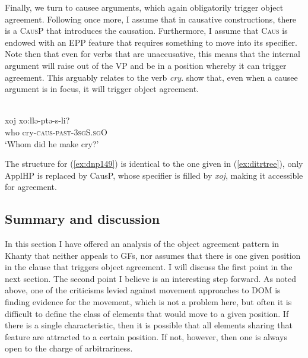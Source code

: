 \documentclass[output=paper
,modfonts
,nonflat]{langsci/langscibook}
\begin{document}
\noindent Finally, we turn to causee arguments, which again obligatorily trigger object agreement.
Following \citet{pylkkanen2008} once more, I assume that in causative constructions, there is a \textsc{CausP} that introduces the causation.
Furthermore, I assume that \textsc{Caus} is endowed with an EPP feature that requires something to move into its specifier. Note then that even for verbs that are unaccusative, this means that the internal argument will raise out of the VP and be in a position whereby it can trigger agreement. This arguably relates to the verb \emph{cry}. \citeauthor{dn2011} show that, even when a causee argument is in focus, it will trigger object agreement. 

\begin{exe}
\ex \citet[][149]{dn2011} \label{ex:dnp149}\\
{\gll xoj xo:llə-ptə-s-li?\\
who cry-\textsc{caus-past-3sgS.sgO}\\
\glt `Whom did he make cry?'}
\end{exe}

\noindent The structure for (\ref{ex:dnp149}) is identical to the one given in (\ref{ex:ditrtree}), only ApplHP is replaced by CausP, whose specifier is filled by \emph{xoj}, making it accessible for agreement.

\subsection{Summary and discussion}

In this section I have offered an analysis of the object agreement pattern in Khanty that neither appeals to GFs, nor assumes that there is one given position in the clause that triggers object agreement. 
I will discuss the first point in the next section.
The second point I believe is an interesting step forward. 
As noted above, one of the criticisms levied against movement approaches to DOM is finding evidence for the movement, which is not a problem here, but often it is difficult to define the class of elements that would move to a given position. 
If there is a single characteristic, then it is possible that all elements sharing that feature are attracted to a certain position.
If not, however, then one is always open to the charge of arbitrariness.
\end{document}

